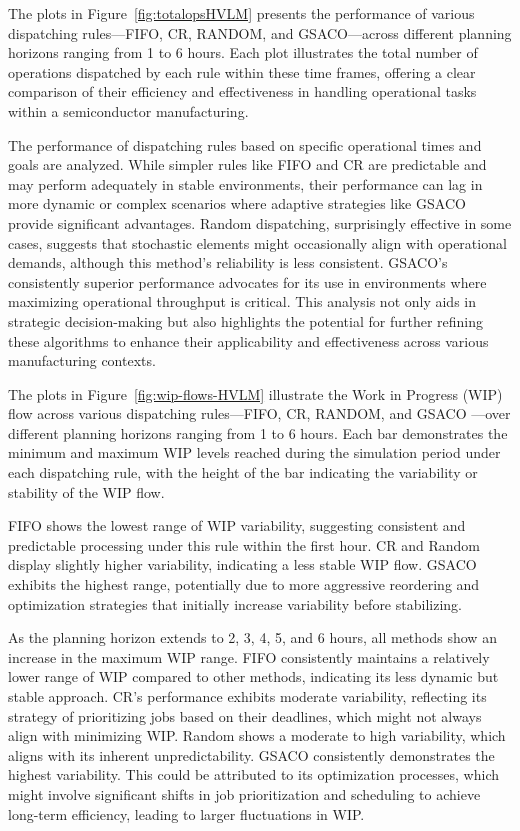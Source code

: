 The plots in Figure~\ref{fig:totalopsHVLM} presents the performance of various dispatching rules—FIFO, CR, RANDOM, and GSACO—across different planning horizons ranging from 1 to 6 hours. Each plot illustrates the total number of operations dispatched by each rule within these time frames, offering a clear comparison of their efficiency and effectiveness in handling operational tasks within a semiconductor manufacturing.

The performance of dispatching rules based on specific operational times and goals are analyzed. While simpler rules like FIFO and CR are predictable and may perform adequately in stable environments, their performance can lag in more dynamic or complex scenarios where adaptive strategies like GSACO provide significant advantages. Random dispatching, surprisingly effective in some cases, suggests that stochastic elements might occasionally align with operational demands, although this method's reliability is less consistent. GSACO's consistently superior performance advocates for its use in environments where maximizing operational throughput is critical. This analysis not only aids in strategic decision-making but also highlights the potential for further refining these algorithms to enhance their applicability and effectiveness across various manufacturing contexts.

The plots in Figure~\ref{fig:wip-flows-HVLM} illustrate the Work in Progress (WIP) flow across various dispatching rules—FIFO, CR, RANDOM, and GSACO —over different planning horizons ranging from 1 to 6 hours. Each bar demonstrates the minimum and maximum WIP levels reached during the simulation period under each dispatching rule, with the height of the bar indicating the variability or stability of the WIP flow.

FIFO shows the lowest range of WIP variability, suggesting consistent and predictable processing under this rule within the first hour. CR and Random display slightly higher variability, indicating a less stable WIP flow.
GSACO exhibits the highest range, potentially due to more aggressive reordering and optimization strategies that initially increase variability before stabilizing.

As the planning horizon extends to 2, 3, 4, 5, and 6 hours, all methods show an increase in the maximum WIP range. FIFO consistently maintains a relatively lower range of WIP compared to other methods, indicating its less dynamic but stable approach.
CR's performance exhibits moderate variability, reflecting its strategy of prioritizing jobs based on their deadlines, which might not always align with minimizing WIP.
Random shows a moderate to high variability, which aligns with its inherent unpredictability.
GSACO consistently demonstrates the highest variability. This could be attributed to its optimization processes, which might involve significant shifts in job prioritization and scheduling to achieve long-term efficiency, leading to larger fluctuations in WIP.

